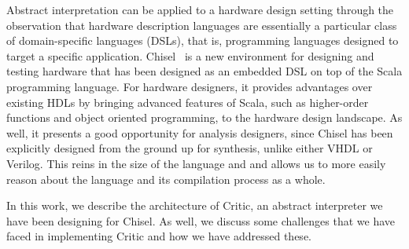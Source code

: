 \documentclass[10pt,conference]{IEEEtran}
\begin{document}
Abstract interpretation can be applied to a hardware design setting through
the observation that hardware description languages are essentially a particular
class of
domain-specific languages (DSLs), that is, programming languages designed to target
a specific application. Chisel~\cite{asanovic12} is a new environment for
designing and testing hardware that has been designed as an embedded DSL on top
of the Scala programming language. For hardware designers, it provides
advantages over existing HDLs by bringing advanced features of Scala, such
as higher-order functions and object oriented programming, to the hardware
design landscape. As well, it presents a good opportunity for analysis designers,
since Chisel has been explicitly designed from the ground up for synthesis, 
unlike either VHDL or Verilog. This reins in the size of the language and 
and allows us to more easily reason about the language and its compilation process
as a whole.

In this work, we describe the architecture of Critic, an abstract interpreter
we have been designing for Chisel. As well, we discuss some challenges that we have
faced in implementing Critic and how we have addressed these.

%
%

\end{document}
